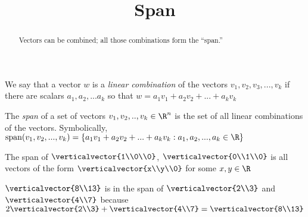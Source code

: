 \documentclass{ximera}
\title{Span}
\begin{document}
\begin{abstract}
  Vectors can be combined; all those combinations form the ``span.''
\end{abstract}

\begin{definition}
  We say that a vector $w$ is a \textit{linear combination} of the vectors $v_1,v_2,v_3,...,v_k$ if there are scalars $a_1,a_2,...a_k$ 
  so that $w = a_1v_1+a_2v_2+...+a_kv_k$
\end{definition}
  		
\begin{definition}
  The \textit{span} of a set of vectors $v_1,v_2, ..,v_k \in \R^n$ is the set of all linear combinations of the vectors.
  Symbolically, $\text{span}(v_1,v_2,...,v_k) = \{ a_1v_1+a_2v_2+...+a_kv_k : a_1,a_2, ...,a_k \in \R\}$
\end{definition}

\begin{example}
  The span of $\verticalvector{1\\0\\0}$, $\verticalvector{0\\1\\0}$ is all vectors of the form $\verticalvector{x\\y\\0}$ for some $x,y \in \R$
\end{example}

\begin{example}
  $\verticalvector{8\\13}$ is in the span of $\verticalvector{2\\3}$ and $\verticalvector{4\\7}$ because
  $2\verticalvector{2\\3} + \verticalvector{4\\7} = \verticalvector{8\\13}$ 
\end{example}
\end{document}
